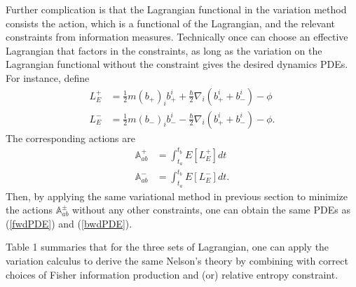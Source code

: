 \documentclass[%
 aip, 
 amsmath,amssymb,amsthm,
 nofootinbib,
 reprint,
]{revtex4-1}
\begin{document}
Further complication is that the Lagrangian functional in the variation method consists the action, which is a functional of the Lagrangian, and the relevant constraints from information measures. Technically once can choose an effective Lagrangian that factors in the constraints, as long as the variation on the Lagrangian functional without the constraint gives the desired dynamics PDEs. For instance, define
\begin{equation}
\label{Leff}
\begin{split}
    L_{E}^+ &= \frac{1}{2}m(b_+)_ib_+^i + \frac{\hbar}{2}\nabla_i(b_+^i+ b_-^i) - \phi \\
    L_{E}^- &= \frac{1}{2}m(b_-)_ib_-^i - \frac{\hbar}{2}\nabla_i(b_+^i+ b_-^i) - \phi.
    \end{split}
\end{equation}
The corresponding actions are 
\begin{equation}
    \label{E_Action}
    \begin{split}
    \mathbb{A}_{ab}^+ &= \int_{t_a}^{t_b} E [L_E^+]dt \\
    \mathbb{A}_{ab}^- &= \int_{t_a}^{t_b} E [L_E^-]dt .
    \end{split}
\end{equation}
Then, by applying the same variational method in previous section to minimize the actions $\mathbb{A}_{ab}^{\pm}$ without any other constraints, one can obtain the same PDEs as (\ref{fwdPDE}) and (\ref{bwdPDE}).

Table 1 summaries that for the three sets of Lagrangian, one can apply the variation calculus to derive the same Nelson's theory by combining with correct choices of Fisher information production and (or) relative entropy constraint.
\end{document}
